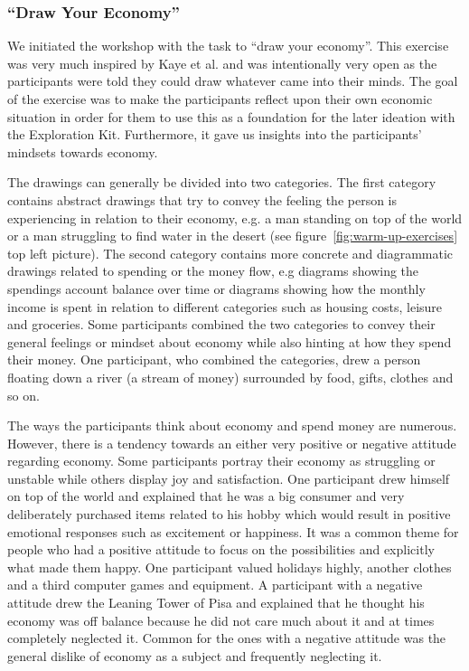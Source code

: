 \subsubsection*{“Draw Your Economy”}
We initiated the workshop with the task to “draw your economy”. This exercise was very much inspired by Kaye et al. \cite[p.~522]{kaye2014money} and was intentionally very open as the participants were told they could draw whatever came into their minds. The goal of the exercise was to make the participants reflect upon their own economic situation in order for them to use this as a foundation for the later ideation with the Exploration Kit. Furthermore, it gave us insights into the participants’ mindsets towards economy.

The drawings can generally be divided into two categories. The first category contains abstract drawings that try to convey the feeling the person is experiencing in relation to their economy, e.g. a man standing on top of the world or a man struggling to find water in the desert (see figure~\ref{fig:warm-up-exercises} top left picture). The second category contains more concrete and diagrammatic drawings related to spending or the money flow, e.g diagrams showing the spendings account balance over time or diagrams showing how the monthly income is spent in relation to different categories such as housing costs, leisure and groceries. Some participants combined the two categories to convey their general feelings or mindset about economy while also hinting at how they spend their money. One participant, who combined the categories, drew a person floating down a river (a stream of money) surrounded by food, gifts, clothes and so on.

The ways the participants think about economy and spend money are numerous. However, there is a tendency towards an either very positive or negative attitude regarding economy. Some participants portray their economy as struggling or unstable while others display joy and satisfaction. One participant drew himself on top of the world and explained that he was a big consumer and very deliberately purchased items related to his hobby which would result in positive emotional responses such as excitement or happiness. It was a common theme for people who had a positive attitude to focus on the possibilities and explicitly what made them happy. One participant valued holidays highly, another clothes and a third computer games and equipment. A participant with a negative attitude drew the Leaning Tower of Pisa and explained that he thought his economy was off balance because he did not care much about it and at times completely neglected it. Common for the ones with a negative attitude was the general dislike of economy as a subject and frequently neglecting it.

